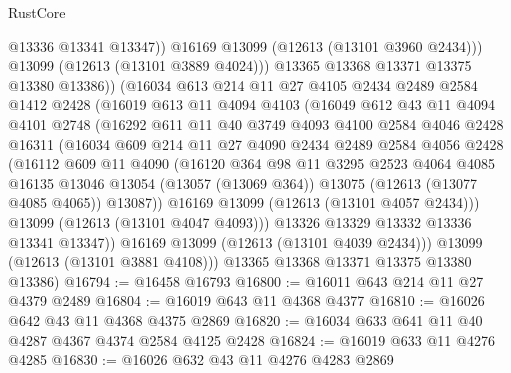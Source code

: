 \begin{lexlean}{RustCore}
\begin{coremodule}
                    @13336
                    @13341
                    @13347))
                @16169
                @13099
                (@12613 (@13101 @3960 @2434)))
              @13099
              (@12613 (@13101 @3889 @4024)))
            @13365
            @13368
            @13371
            @13375
            @13380
            @13386))
        (@16034
          @613
          @214
          @11
          @27
          @4105
          @2434
          @2489
          @2584
          @1412
          @2428
          (@16019
            @613
            @11
            @4094
            @4103
            (@16049
              @612
              @43
              @11
              @4094
              @4101
              @2748
              (@16292
                @611
                @11
                @40
                @3749
                @4093
                @4100
                @2584
                @4046
                @2428
                @16311
                (@16034
                  @609
                  @214
                  @11
                  @27
                  @4090
                  @2434
                  @2489
                  @2584
                  @4056
                  @2428
                  (@16112
                    @609
                    @11
                    @4090
                    (@16120
                      @364
                      @98
                      @11
                      @3295
                      @2523
                      @4064
                      @4085
                      @16135
                      @13046
                      @13054
                      (@13057 (@13069 @364))
                      @13075
                      (@12613 (@13077 @4085 @4065))
                      @13087))
                  @16169
                  @13099
                  (@12613 (@13101 @4057 @2434)))
                @13099
                (@12613 (@13101 @4047 @4093)))
              @13326
              @13329
              @13332
              @13336
              @13341
              @13347))
          @16169
          @13099
          (@12613 (@13101 @4039 @2434)))
        @13099
        (@12613 (@13101 @3881 @4108)))
      @13365
      @13368
      @13371
      @13375
      @13380
      @13386)
@16794 := @16458 @16793
@16800 := @16011 @643 @214 @11 @27 @4379 @2489
@16804 := @16019 @643 @11 @4368 @4377
@16810 := @16026 @642 @43 @11 @4368 @4375 @2869
@16820 := @16034 @633 @641 @11 @40 @4287 @4367 @4374 @2584 @4125 @2428
@16824 := @16019 @633 @11 @4276 @4285
@16830 := @16026 @632 @43 @11 @4276 @4283 @2869

\end{coremodule}
\end{lexlean}
